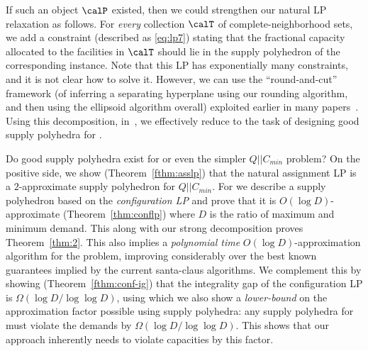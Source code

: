  If such an object $\calP$ existed, then we could strengthen our natural LP relaxation as follows. For {\em every} collection $\calT$ of complete-neighborhood sets, we add a constraint (described as \eqref{eq:lp7}) stating that the fractional capacity allocated to the facilities in $\calT$ should
 lie in the supply polyhedron of the corresponding \cckp instance. Note that this LP has exponentially many constraints, and it is not clear how to solve it. However, we can use the ``round-and-cut'' framework (of inferring a separating hyperplane using our rounding algorithm, and then using the ellipsoid algorithm overall) exploited earlier in many papers~\cite{CarrFLP00,ChakrabartyCKK11,AnSS14,DemirciL16,Li15,Li16}.
 Using this decomposition, in~, we effectively reduce \mckc to the task of designing good supply polyhedra for \cckp.

\medskip {}
Do good supply polyhedra exist for \cckp or even the simpler $Q||C_{min} $ problem?
On the positive side, we show (Theorem~\ref{fthm:asslp}) that the natural assignment LP is a $2$-approximate supply polyhedron for $Q||C_{min}$. For \cckp we describe a supply polyhedron based on the {\em configuration LP} and prove that it is $O(\log D)$-approximate (Theorem~\ref{thm:conflp}) where $D$ is the ratio of maximum and minimum demand. This along with our strong decomposition proves Theorem~\ref{thm:2}. This also implies a {\em polynomial time} $O(\log D)$-approximation algorithm for the \cckp problem, improving considerably over the best known guarantees implied by the current santa-claus algorithms. %
We complement this by showing (Theorem~\ref{fthm:conf-ig}) that the integrality gap of the configuration LP is $\Omega(\log D/\log\log D)$, using which we also show a \emph{lower-bound} on the approximation factor possible using supply polyhedra: any supply polyhedra for \cckp must violate the demands by $\Omega(\log D/\log \log D)$. This shows that our approach inherently needs to violate capacities by this factor.

